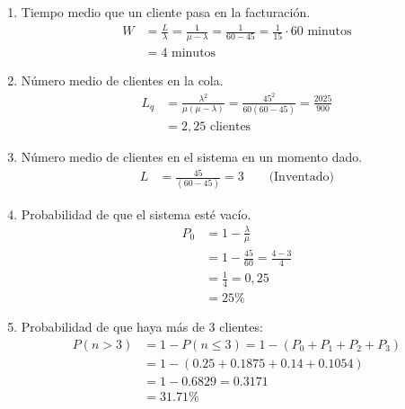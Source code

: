 \documentclass{templateNote}
\begin{document}
\begin{enumerate}
    \renewcommand{\labelenumi}{\alph{enumi})}
    \item Tiempo medio que un cliente pasa en la facturaci\'on.
    \begin{align*}
        W &= \frac{L}{\lambda} = \frac{1}{\mu - \lambda} = \frac{1}{60 - 45} = \frac{1}{15} \cdot 60 \text{ minutos} \\
        &= 4 \text{ minutos} 
    \end{align*}

    \item N\'umero medio de clientes en la cola.
    \begin{align*}
        L_q &= \frac{\lambda^2}{\mu (\mu - \lambda)} = \frac{45^2}{60(60-45)} = \frac{2025}{900} \\
        &= 2,25 \text{ clientes}
    \end{align*}
    \item N\'umero medio de clientes en el sistema en un momento dado.
    \begin{align*}
        L &= \frac{45}{(60-45)} = 3 \qquad \text{(Inventado)}
    \end{align*}

    \item Probabilidad de que el sistema est\'e vac\'io.
    \begin{align*}
        P_0 &= 1 - \frac{\lambda}{\mu} \\
        &= 1 - \frac{45}{60} = \frac{4-3}{4} \\
        &= \frac{1}{4} = 0,25 \\
        &= 25\%
    \end{align*}

    \item Probabilidad de que haya m\'as de 3 clientes:
    \begin{align*}
        P(n > 3) &= 1 - P(n \leq 3) = 1 - (P_0 + P_1 + P_2 + P_3) \\
        &= 1 - (0.25 + 0.1875 + 0.14 + 0.1054) \\
        &= 1 - 0.6829 = 0.3171 \\
        &= 31.71\%
    \end{align*}
\end{enumerate}

\newpage
\end{document}
